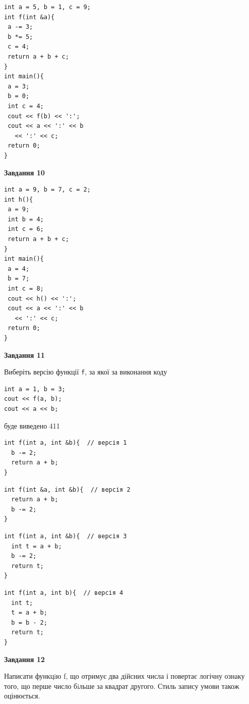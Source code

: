 \documentclass[12pt, ukrainian]{article}
\def\code#1{\Verb!#1!}
\begin{document}
{\begin {large}
\begin{minipage}[t]{7.0cm}
\begin{verbatim}
int a = 5, b = 1, c = 9;
int f(int &a){
 a -= 3;
 b *= 5;
 c = 4;
 return a + b + c;
}
int main(){
 a = 3;
 b = 0;
 int c = 4;
 cout << f(b) << ':';
 cout << a << ':' << b 
   << ':' << c;
 return 0;
}
\end{verbatim}



\begin{center}
\textbf{Завдання 10}
\end{center}
\vspace{-8mm}

\begin{verbatim}
int a = 9, b = 7, c = 2;
int h(){
 a = 9;
 int b = 4;
 int c = 6;
 return a + b + c;
}
int main(){
 a = 4;
 b = 7;
 int c = 8;
 cout << h() << ':';
 cout << a << ':' << b 
   << ':' << c;
 return 0;
}
\end{verbatim}

\end{minipage}
\vline \hspace{1mm}
\begin{minipage}[t]{11.0cm}

\begin{center}
\textbf{Завдання 11}
\end{center}
Виберіть версію функції \code{f}, за якої за виконання коду
\begin{verbatim}
int a = 1, b = 3;
cout << f(a, b);
cout << a << b;
\end{verbatim}

буде виведено 411

\begin{verbatim}
int f(int a, int &b){  // версія 1
  b -= 2;
  return a + b;
}
\end{verbatim}

\vspace{-8mm}\begin{verbatim}
int f(int &a, int &b){  // версія 2
  return a + b;
  b -= 2;
}
\end{verbatim}

\vspace{-8mm}\begin{verbatim}
int f(int a, int &b){  // версія 3
  int t = a + b;
  b -= 2;
  return t;
}
\end{verbatim}

\vspace{-8mm}\begin{verbatim}
int f(int a, int b){  // версія 4
  int t;
  t = a + b;
  b = b - 2;
  return t;
}
\end{verbatim}



\begin{center}
\textbf{Завдання 12}
\end{center}

Написати функцiю f, що отримує два дійсних числа і повертає логічну ознаку того, що перше число бiльше за квадрат другого. Стиль запису умови також оцінюється.\par

\end{minipage}

\end {large}}
\end{document}
